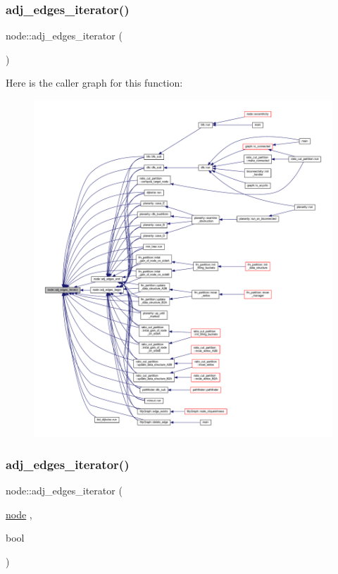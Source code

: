 \subsubsection{\texorpdfstring{adj\+\_\+edges\+\_\+iterator()}{adj\_edges\_iterator()}\hspace{0.1cm}{\footnotesize\ttfamily [1/2]}}
{\footnotesize\ttfamily node\+::adj\+\_\+edges\+\_\+iterator (\begin{DoxyParamCaption}{ }\end{DoxyParamCaption})}

Here is the caller graph for this function\+:\nopagebreak
\begin{figure}[H]
\begin{center}
\leavevmode
\includegraphics[width=350pt]{classnode_a12cb1a2167f5f03c054de5e707d3156f_icgraph}
\end{center}
\end{figure}
\mbox{\label{classnode_a1b7aa43ddd3e7f392479c479400ebb75}} 
\subsubsection{\texorpdfstring{adj\+\_\+edges\+\_\+iterator()}{adj\_edges\_iterator()}\hspace{0.1cm}{\footnotesize\ttfamily [2/2]}}
{\footnotesize\ttfamily node\+::adj\+\_\+edges\+\_\+iterator (\begin{DoxyParamCaption}\item[{\mbox{\hyperlink{classnode}{node}}}]{,  }\item[{bool}]{ }\end{DoxyParamCaption})}

